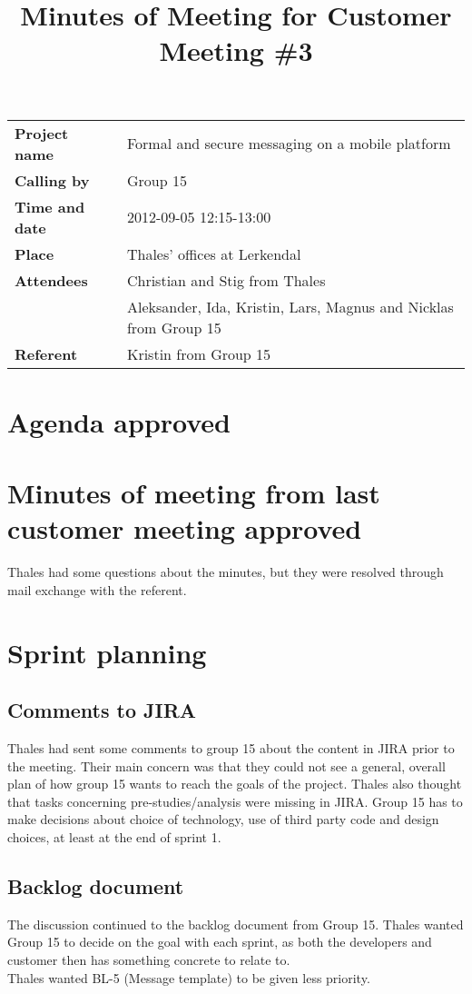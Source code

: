 \documentclass[a4paper,12pt]{article}
\begin{document}
\title{Minutes of Meeting for Customer Meeting \#3}
\maketitle
\begin{tabular}{>{\bfseries}l l}	
Project name&Formal and secure messaging on a mobile platform\\
Calling by&Group 15\\
Time and date&2012-09-05 12:15-13:00\\
Place&Thales' offices at Lerkendal\\
Attendees&Christian and Stig from Thales\\
& Aleksander, Ida, Kristin, Lars, Magnus and Nicklas from Group 15 \\
Referent&Kristin from Group 15\\
\end{tabular}
\section{Agenda approved}
\section{Minutes of meeting from last customer meeting approved}
Thales had some questions about the minutes, but they were resolved through mail exchange with the referent.
\section{Sprint planning}
\subsection{Comments to JIRA}
Thales had sent some comments to group 15 about the content in JIRA prior to the meeting. Their main concern was that they could not see a general, overall plan of how group 15 wants to reach the goals of the project. Thales also thought that tasks concerning pre-studies/analysis were missing in JIRA. Group 15 has to make decisions about choice of technology, use of third party code and design choices, at least at the end of sprint 1.
\subsection{Backlog document}
The discussion continued to the backlog document from Group 15. Thales wanted Group 15 to decide on the goal with each sprint, as both the developers and customer then has something concrete to relate to.\\
Thales wanted BL-5 (Message template) to be given less priority.
\end{document}
